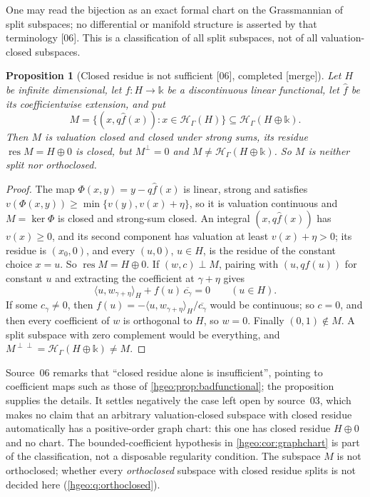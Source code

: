 \documentclass[11pt,letterpaper]{article}
\numberwithin{equation}{section}
\newtheorem{proposition}[proposition]{Proposition}
\theoremstyle{definition}
\theoremstyle{remark}
\newcommand{\kk}{\mathbb k}
\newcommand{\HH}[1]{\mathscr H_\Gamma(#1)}
\newcommand{\res}{\operatorname{res}}
\newcommand{\ip}[2]{\langle #1,#2\rangle}
\newcommand{\src}[1]{\textup{\textsf{\small[#1]}}}
\newcommand{\mergetag}{\textup{\textsf{\small[merge]}}}
\begin{document}
One may read the bijection as an exact formal chart on the Grassmannian of
split subspaces; no differential or manifold structure is asserted by that
terminology \src{06}. This is a classification of all split subspaces, not
of all valuation-closed subspaces.

\begin{proposition}[Closed residue is not sufficient \src{06}, completed
\mergetag]\label{hgeo:prop:closedresidue}
Let $H$ be infinite dimensional, let $f:H\to\kk$ be a discontinuous linear
functional, let $\widehat f$ be its coefficientwise extension, and put
\[
 M=\{(x,q\widehat f(x)):x\in\HH{H}\}\subseteq\HH{H\oplus\kk}.
\]
Then $M$ is valuation closed and closed under strong sums, its residue
$\res M=H\oplus0$ is closed, but $M^\perp=0$ and $M\ne\HH{H\oplus\kk}$. So
$M$ is neither split nor orthoclosed.
\end{proposition}
\begin{proof}
The map $\Phi(x,y)=y-q\widehat f(x)$ is linear, strong and satisfies
$v(\Phi(x,y))\ge\min\{v(y),v(x)+\eta\}$, so it is valuation continuous and
$M=\ker\Phi$ is closed and strong-sum closed. An integral $(x,q\widehat f(x))$
has $v(x)\ge0$, and its second component has valuation at least
$v(x)+\eta>0$; its residue is $(x_0,0)$, and every $(u,0)$, $u\in H$, is the
residue of the constant choice $x=u$. So $\res M=H\oplus0$. If $(w,c)\perp M$,
pairing with $(u,qf(u))$ for constant $u$ and extracting the coefficient at
$\gamma+\eta$ gives
\[
 \ip{u}{w_{\gamma+\eta}}_H+f(u)\,\overline{c_\gamma}=0\qquad(u\in H).
\]
If some $c_\gamma\ne0$, then $f(u)=-\ip{u}{w_{\gamma+\eta}}_H/
\overline{c_\gamma}$ would be continuous; so $c=0$, and then every
coefficient of $w$ is orthogonal to $H$, so $w=0$. Finally $(0,1)\notin M$.
A split subspace with zero complement would be everything, and
$M^{\perp\perp}=\HH{H\oplus\kk}\ne M$.
\end{proof}

Source~06 remarks that ``closed residue alone is insufficient'', pointing to
coefficient maps such as those of \cref{hgeo:prop:badfunctional}; the
proposition supplies the details. It settles negatively the case left open
by source~03, which makes no claim that an arbitrary valuation-closed
subspace with closed residue automatically has a positive-order graph
chart: this one has closed residue $H\oplus0$ and no chart. The
bounded-coefficient hypothesis in \cref{hgeo:cor:graphchart} is part of the
classification, not a disposable regularity condition. The subspace $M$ is
not orthoclosed; whether every \emph{orthoclosed} subspace with closed
residue splits is not decided here (\cref{hgeo:q:orthoclosed}).
\end{document}
